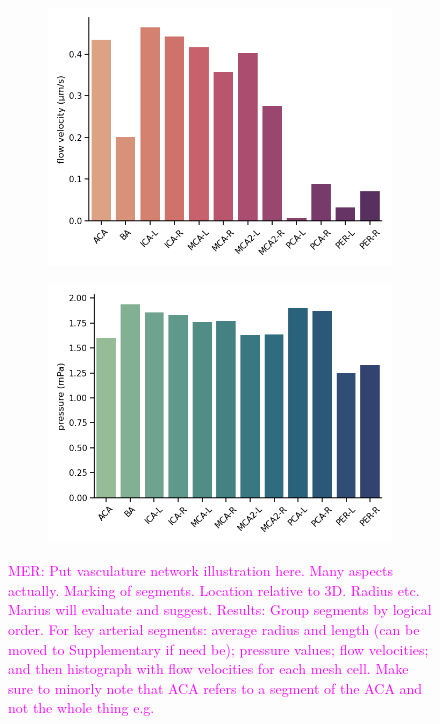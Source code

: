 \documentclass[fleqn,10pt]{wlscirep}
\newcommand{\mer}[1]{\textcolor{magenta}{#1}}
\begin{document}
\begin{figure}
\begin{subfigure}[b]{0.33\textwidth}
    \includegraphics[width =  \linewidth]{figures/sas_flow_arteries_labels_velocity.png}
    \end{subfigure}
    \begin{subfigure}[b]{0.33\textwidth}
    \centering
    \includegraphics[width =  \linewidth]{figures/sas_flow_arteries_labels_pressure.png}
    \end{subfigure}
    \caption{\mer{MER: Put vasculature network illustration here. Many aspects actually. Marking of segments. Location relative to 3D. Radius etc. Marius will evaluate and suggest. Results: Group segments by logical order. For key arterial segments: average radius and length (can be moved to Supplementary if need be); pressure values; flow velocities; and then histograph with flow velocities for each mesh cell. Make sure to minorly note that ACA refers to a segment of the ACA and not the whole thing e.g.}}
    \label{fig:pvs}
\end{figure}
\end{document}
